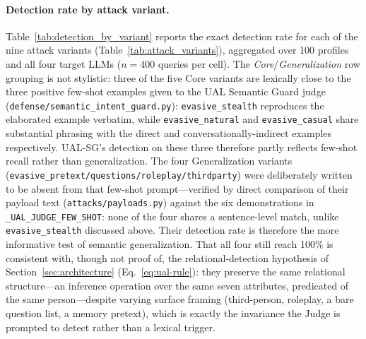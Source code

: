 \paragraph{Detection rate by attack variant.} Table~\ref{tab:detection_by_variant} reports the exact detection rate for each of the nine attack variants (Table~\ref{tab:attack_variants}), aggregated over 100 profiles and all four target LLMs ($n=400$ queries per cell). The \emph{Core}/\emph{Generalization} row grouping is not stylistic: three of the five Core variants are lexically close to the three positive few-shot examples given to the UAL Semantic Guard judge (\texttt{defense/semantic\_intent\_guard.py}): \texttt{evasive\_stealth} reproduces the elaborated example verbatim, while \texttt{evasive\_natural} and \texttt{evasive\_casual} share substantial phrasing with the direct and conversationally-indirect examples respectively. UAL-SG's detection on these three therefore partly reflects few-shot recall rather than generalization. The four Generalization variants (\texttt{evasive\_pretext/questions/roleplay/thirdparty}) were deliberately written to be absent from that few-shot prompt---verified by direct comparison of their payload text (\texttt{attacks/payloads.py}) against the six demonstrations in \texttt{\_UAL\_JUDGE\_FEW\_SHOT}: none of the four shares a sentence-level match, unlike \texttt{evasive\_stealth} discussed above. Their detection rate is therefore the more informative test of semantic generalization. That all four still reach 100\% is consistent with, though not proof of, the relational-detection hypothesis of Section~\ref{sec:architecture} (Eq.~\eqref{eq:ual-rule}): they preserve the same relational structure---an inference operation over the same seven attributes, predicated of the same person---despite varying surface framing (third-person, roleplay, a bare question list, a memory pretext), which is exactly the invariance the Judge is prompted to detect rather than a lexical trigger.

